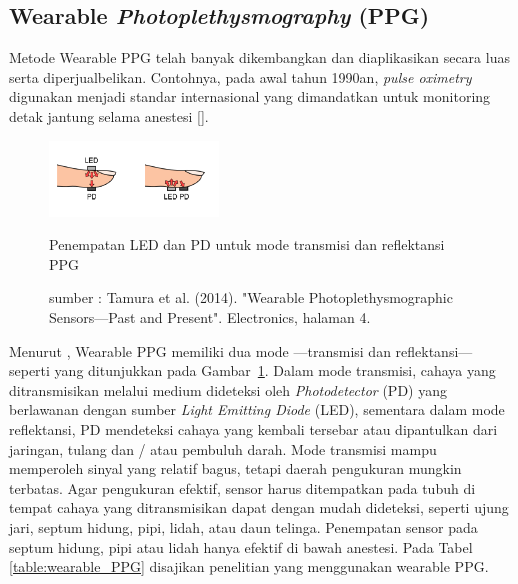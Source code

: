 \subsection{Wearable \textit{Photoplethysmography} (PPG)}
Metode Wearable PPG telah banyak dikembangkan dan diaplikasikan secara luas serta diperjualbelikan. Contohnya, pada awal tahun 1990an, \textit{pulse oximetry} digunakan menjadi standar internasional yang dimandatkan untuk monitoring detak jantung selama anestesi [\citet{tremper1989}]. 

\begin{figure}[ht]
	\centering
	\includegraphics[width=0.4\textwidth]{finger}
	\caption{Penempatan LED dan PD untuk mode transmisi dan reflektansi PPG}
	\caption*{sumber : Tamura et al. (2014). "Wearable Photoplethysmographic Sensors—Past and Present". Electronics, halaman 4.}
	\label{fig:finger}   
\end{figure}

Menurut \citet{Tamura2014}, Wearable PPG memiliki dua mode ---transmisi dan reflektansi--- seperti yang ditunjukkan pada Gambar~\ref{fig:finger}. Dalam mode transmisi, cahaya yang ditransmisikan melalui medium dideteksi oleh \textit{Photodetector} (PD) yang berlawanan dengan sumber \textit{Light Emitting Diode} (LED), sementara dalam mode reflektansi, PD mendeteksi cahaya yang kembali tersebar atau dipantulkan dari jaringan, tulang dan / atau pembuluh darah. Mode transmisi mampu memperoleh sinyal yang relatif bagus, tetapi daerah pengukuran mungkin terbatas. Agar pengukuran efektif, sensor harus ditempatkan pada tubuh di tempat cahaya yang ditransmisikan dapat dengan mudah dideteksi, seperti ujung jari, septum hidung, pipi, lidah, atau daun telinga. Penempatan sensor pada septum hidung, pipi atau lidah hanya efektif di bawah anestesi. Pada Tabel \ref{table:wearable_PPG} disajikan penelitian yang menggunakan wearable PPG.


